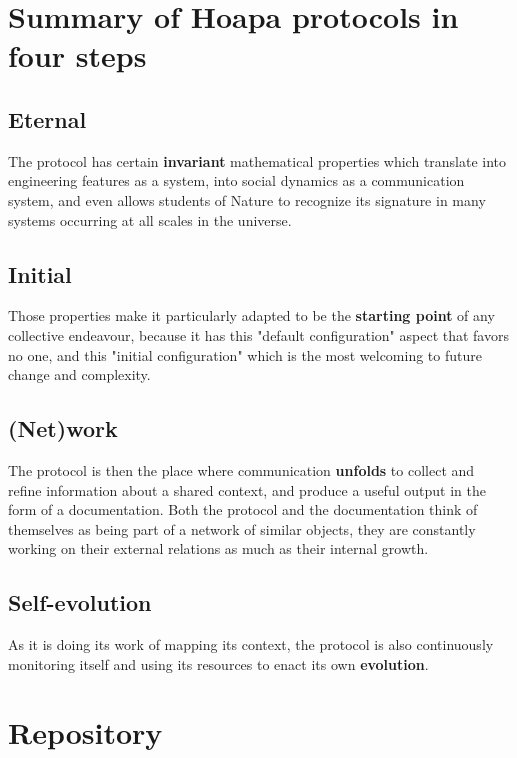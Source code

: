 \documentclass[11pt]{article}
\begin{document}
\section{Summary of Hoapa protocols in four steps}

\subsection{Eternal}

The protocol has certain \textbf{invariant} mathematical properties which translate into engineering features as a system, into social dynamics as a communication system, and even allows students of Nature to recognize its signature in many systems occurring at all scales in the universe.

\subsection{Initial}

Those properties make it particularly adapted to be the \textbf{starting point} of any collective endeavour, because it has this "default configuration" aspect that favors no one, and this "initial configuration" which is the most welcoming to future change and complexity.

\subsection{(Net)work}

The protocol is then the place where communication \textbf{unfolds} to collect and refine information about a shared context, and produce a useful output in the form of a documentation. Both the protocol and the documentation think of themselves as being part of a network of similar objects, they are constantly working on their external relations as much as their internal growth.

\subsection{Self-evolution}

As it is doing its work of mapping its context, the protocol is also continuously monitoring itself and using its resources to enact its own \textbf{evolution}.

\section{Repository}
\end{document}

